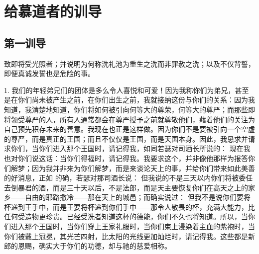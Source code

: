 
\chapter{给慕道者的训导}



\section{第一训导}

致即将受光照者；并说明为何称洗礼池为重生之洗而非罪赦之洗；以及不仅背誓，即便真诚发誓也是危险的事。\par

1. 我们的年轻弟兄们的团体是多么令人喜悦和可爱！因为我称你们为弟兄，甚至是在你们尚未被产生之前，在你们出生之前，我就接纳这份与你们的关系：因为我知道，我清楚地知道，你们将如何被引向何等大的尊荣，何等大的尊严；而那些即将领受尊严的人，所有人通常都会在尊严授予之前就尊敬他们，藉着他们的关注为自己预先积存未来的善意。我现在也正是这样做。因为你们不是要被引向一个空虚的尊严，而是真正的王国；而且不仅仅是王国，而是天国本身。因此，我恳求并请求你们，当你们进入那个王国时，请记得我，如同若瑟对司酒长所说的：  现在我也对你们说这话：当你们得福时，请记得我。我要求这个，并非像他那样为报答你们解梦；因为我并非来为你们解梦，而是来谈论天上的事，并给你们带来如此美善的好消息，正如  的确，若瑟对那司酒长说： 但我说的不是三天以内你们将被委任去倒暴君的酒，而是三十天以后，不是法郎，而是天主要恢复你们在高天之上的家乡——自由的耶路撒冷——那在天上的城邑；而确实说过： 但我不是说你们要将杯递到王手中，而是王要将杯递到你们手中——那令人敬畏的杯，充满大能力，比任何受造物更珍贵。已经受洗者知道这杯的德能，你们不久也将知道。所以，当你们进入那个王国时，当你们穿上王家礼服时，当你们束上浸染着主血的紫袍时，当你们被戴上冠冕，其光芒四射，比太阳的光线更加灿烂时，请记得我。这些都是新郎的恩赐，确实大于你们的功德，却与祂的慈爱相称。\par

